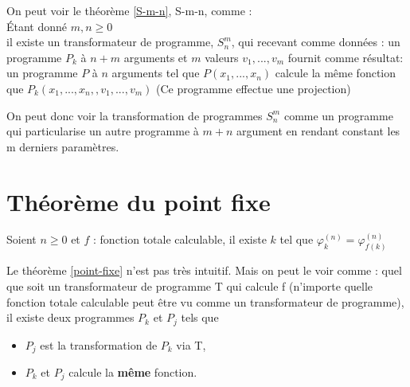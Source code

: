 \begin{myrem}
	On peut voir le théorème \ref{S-m-n}, S-m-n, comme : \\
	Étant donné $m,n \geq 0$\\
	il existe un transformateur de programme, $S^m_n$, qui recevant comme
	données : un programme $P_k$ à $n+m$ arguments et $m$ valeurs $v_1,...,v_m$
	fournit comme résultat: un programme $P$ à $n$ arguments tel que
	$P(x_1,...,x_n)$ calcule la même fonction que
	$P_k(x_1,...,x_n,,v_1,...,v_m)$ (Ce programme effectue une projection)
\end{myrem}

\begin{myrem}
	On peut donc voir la transformation de programmes $S^m_n$ comme un
	programme qui particularise un autre programme à $m+n$ argument en rendant
	constant les m derniers paramètres.
\end{myrem}

\section{Théorème du point fixe}
\label{sec:th_or_me_du_point_fixe}
\begin{mytheo}
	\label{point-fixe}
    Soient $n \geq 0$ et $f$ : fonction totale
	calculable, il existe $k$ tel que $\varphi^{(n)}_k = \varphi^{(n)}_{f(k)}$
\end{mytheo}

\begin{myrem}
	Le théorème \ref{point-fixe} n'est pas très intuitif. Mais on peut le
	voir comme : quel que soit un transformateur de programme T qui calcule f (n'importe quelle fonction totale calculable peut être vu comme un transformateur	de programme),
	il existe deux programmes $P_k$ et $P_j$ tels que
	\begin{itemize}
		\item $P_j$ est la transformation de $P_k$ via T,
		\item $P_k$ et $P_j$ calcule la \textbf{même} fonction.
	\end{itemize}
\end{myrem}

